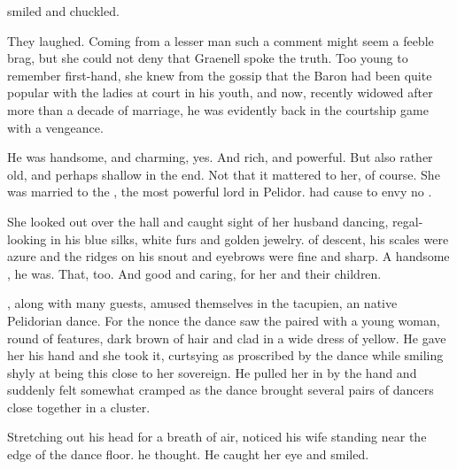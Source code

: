 \begin{garbage}

\Tiroco{} smiled and chuckled. 


They laughed. Coming from a lesser man such a comment might seem a feeble brag, but she could not deny that Graenell spoke the truth. Too young to remember first-hand, she knew from the gossip that the Baron had been quite popular with the ladies at court in his youth, and now, recently widowed after more than a decade of marriage, he was evidently back in the courtship game with a vengeance. 

He was handsome, and charming, yes. And rich, and powerful. But also rather old, and perhaps shallow in the end. Not that it mattered to her, of course. She was married to the \rayuth, the most powerful lord in Pelidor. \Tiroco{} had cause to envy no \sphyle. 

She looked out over the hall and caught sight of her husband dancing, regal-looking in his blue silks, white furs and golden jewelry. \Tepharin{} of descent, his scales were azure and the ridges on his snout and eyebrows were fine and sharp. A handsome \dax, he was. That, too. And good and caring, for her and their children. 

\Rayuth[\Icor], along with many guests, amused themselves in the tacupien, an native Pelidorian dance. For the nonce the dance saw the \rayuth paired with a young woman, round of features, dark brown of hair and clad in a wide dress of yellow. He gave her his hand and she took it, curtsying as proscribed by the dance while smiling shyly at being this close to her sovereign. He pulled her in by the hand and suddenly felt somewhat cramped as the dance brought several pairs of dancers close together in a cluster. 

Stretching out his head for a breath of air, \Icor{} noticed his wife standing near the edge of the dance floor. 
 he thought. He caught her eye and smiled. 


\end{garbage}
